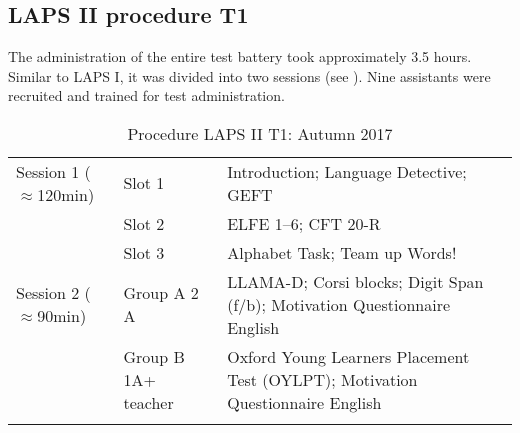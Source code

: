 \documentclass[output=paper]{langsci/langscibook}
\begin{document}
\begin{table}
\caption{Participants LAPS II. T1: Autumn 2017; T2: Spring 2018; T3: Spring 2019\label{tab:02:5}}
\end{table}

 \subsection{LAPS II procedure T1}

The administration of the entire test battery took approximately 3.5 hours. Similar to LAPS I, it was divided into two sessions (see ). Nine assistants were recruited and trained for test administration.

\begin{table}
\begin{tabularx}{\textwidth}{llQ}
\lsptoprule
Session 1 (${\approx}$120min) & Slot 1 & Introduction; Language Detective; GEFT\\
& Slot 2 & ELFE 1--6; CFT 20-R\\
& Slot 3 & Alphabet Task; Team up Words!\\
Session 2 (${\approx}$90min) & Group A 2 A & LLAMA-D; Corsi blocks; Digit Span (f/b); Motivation Questionnaire English\\
& Group B 1A+ teacher & Oxford Young Learners Placement Test (OYLPT); Motivation Questionnaire English\\
\lspbottomrule
\end{tabularx}
\caption{Procedure LAPS II T1: Autumn 2017\label{tab:02:6}}
\end{table}
\end{document}
